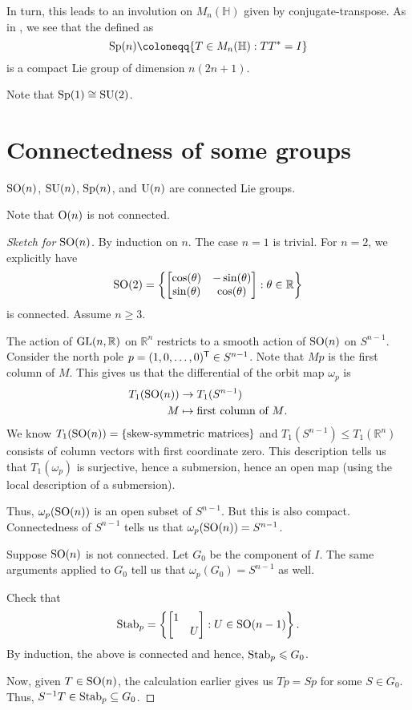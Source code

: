\documentclass[12pt]{article}
\begin{document}
In turn, this leads to an involution on $M_{n}(\mathbb{H})$ given by conjugate-transpose. 
As in , we see that the  defined as
\begin{equation*} 
	\Sp(n) \coloneqq \{T \in M_{n}(\mathbb{H}) : T T^{\ast} = I\}
\end{equation*}
is a compact Lie group of dimension $n(2n + 1)$.

Note that $\operatorname{Sp}(1) \cong \operatorname{SU}(2)$.

\section{Connectedness of some groups} \label{sec:connectedness}

\begin{thm}
	$\operatorname{SO}(n)$, $\operatorname{SU}(n)$, $\operatorname{Sp}(n)$, and $\operatorname{U}(n)$ are connected Lie groups.
\end{thm}
Note that $\operatorname{O}(n)$ is not connected.

\begin{proof}[Sketch for $\operatorname{SO}(n)$]
	By induction on $n$. The case $n = 1$ is trivial. For $n = 2$, we explicitly have
	\begin{equation*} 
		\operatorname{SO}(2) = \left\{\begin{bmatrix} \cos(\theta) & -\sin(\theta) \\ \sin(\theta) & \cos(\theta) \end{bmatrix} : \theta \in \mathbb{R}\right\}
	\end{equation*}
	is connected. Assume $n \ge 3$.

	The action of $\operatorname{GL}(n, \mathbb{R})$ on $\mathbb{R}^{n}$ restricts to a smooth action of $\operatorname{SO}(n)$ on $S^{n - 1}$. 
	Consider the north pole $p = (1, 0, \ldots, 0)^{\mathsf{T}} \in S^{n - 1}$. Note that $Mp$ is the first column of $M$. This gives us that the differential of the orbit map $\omega_{p}$ is
	\begin{align*} 
		T_{1}(\operatorname{SO}(n)) &\to T_{1}(S^{n - 1}) \\
		M &\mapsto \text{first column of $M$}.
	\end{align*}
	We know $T_{1}(\operatorname{SO}(n)) = \{\text{skew-symmetric matrices}\}$ and 
	$T_{1}(S^{n - 1}) \le T_{1}(\mathbb{R}^{n})$ consists of column vectors with first coordinate zero. 
	This description tells us that $T_{1}(\omega_{p})$ is surjective, hence a submersion, hence an open map (using the local description of a submersion). 

	Thus, $\omega_{p}(\operatorname{SO}(n))$ is an open subset of $S^{n - 1}$. But this is also compact. 
	Connectedness of $S^{n - 1}$ tells us that $\omega_{p}(\operatorname{SO}(n)) = S^{n - 1}$.

	Suppose $\operatorname{SO}(n)$ is not connected. 
	Let $G_{0}$ be the component of $I$. 
	The same arguments applied to $G_{0}$ tell us that $\omega_{p}(G_{0}) = S^{n - 1}$ as well.

	Check that
	\begin{equation*} 
		\operatorname{Stab}_{p} = \left\{\begin{bmatrix} 1 &  \\  & U \end{bmatrix} : U \in \operatorname{SO}(n - 1)\right\}.
	\end{equation*}
	By induction, the above is connected and hence, $\operatorname{Stab}_{p} \leqslant G_{0}$.

	Now, given $T \in \operatorname{SO}(n)$, the calculation earlier gives us $Tp = Sp$ for some $S \in G_{0}$. Thus, $S^{-1} T \in \operatorname{Stab}_{p} \subseteq G_{0}$.
\end{proof}
\end{document}

